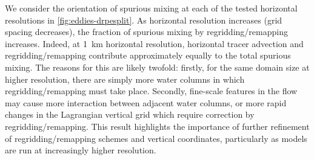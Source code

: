 We consider the orientation of spurious mixing at each of the tested horizontal resolutions in \cref{fig:eddies-drpesplit}. As horizontal resolution increases (grid spacing decreases), the fraction of spurious mixing by regridding/remapping increases. Indeed, at \SI{1}{\kilo\metre} horizontal resolution, horizontal tracer advection and regridding/remapping contribute approximately equally to the total spurious mixing. The reasons for this are likely twofold: firstly, for the same domain size at higher resolution, there are simply more water columns in which regridding/remapping must take place. Secondly, fine-scale features in the flow may cause more interaction between adjacent water columns, or more rapid changes in the Lagrangian vertical grid which require correction by regridding/remapping. This result highlights the importance of further refinement of regridding/remapping schemes and vertical coordinates, particularly as models are run at increasingly higher resolution.
